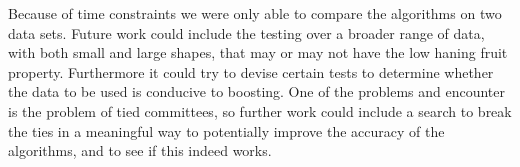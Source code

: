 \par Because of time constraints we were only able to compare the algorithms on two data sets. Future work could include the testing over a broader range of data, with both small and large shapes, that may or may not have the low haning fruit property. Furthermore it could try to devise certain tests to determine whether the data to be used is conducive to boosting. One of the problems \squintB and \NHB encounter is the problem of tied committees, so further work could include a search to break the ties in a meaningful way to potentially improve the accuracy of the algorithms, and to see if this indeed works. 
